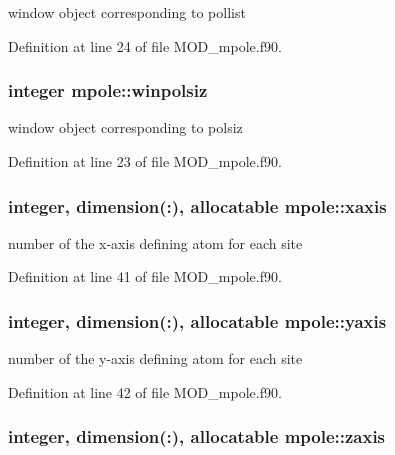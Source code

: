 window object corresponding to pollist 



Definition at line 24 of file M\-O\-D\-\_\-mpole.\-f90.

\hypertarget{classmpole_a5c13bec4bb98474b3cd944ae2ee6c7db}{
\subsubsection[{winpolsiz}]{\setlength{\rightskip}{0pt plus 5cm}integer mpole\-::winpolsiz}}\label{classmpole_a5c13bec4bb98474b3cd944ae2ee6c7db}


window object corresponding to polsiz 



Definition at line 23 of file M\-O\-D\-\_\-mpole.\-f90.

\hypertarget{classmpole_a4b8e5a845d51a21ac98e83e1b7e2becb}{
\subsubsection[{xaxis}]{\setlength{\rightskip}{0pt plus 5cm}integer, dimension(\-:), allocatable mpole\-::xaxis}}\label{classmpole_a4b8e5a845d51a21ac98e83e1b7e2becb}


number of the x-\/axis defining atom for each site 



Definition at line 41 of file M\-O\-D\-\_\-mpole.\-f90.

\hypertarget{classmpole_a794e9bdc1e6b42890a05233beb552613}{
\subsubsection[{yaxis}]{\setlength{\rightskip}{0pt plus 5cm}integer, dimension(\-:), allocatable mpole\-::yaxis}}\label{classmpole_a794e9bdc1e6b42890a05233beb552613}


number of the y-\/axis defining atom for each site 



Definition at line 42 of file M\-O\-D\-\_\-mpole.\-f90.

\hypertarget{classmpole_acc3be383ead6de1c43b0406211e74582}{
\subsubsection[{zaxis}]{\setlength{\rightskip}{0pt plus 5cm}integer, dimension(\-:), allocatable mpole\-::zaxis}}\label{classmpole_acc3be383ead6de1c43b0406211e74582}


